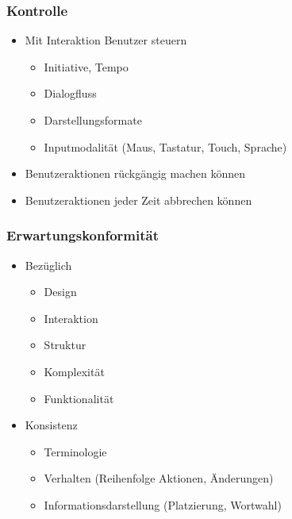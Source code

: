 \documentclass[../ZF_SWEN1.tex]{subfiles}
\begin{document}
\subsubsection{Kontrolle}

\begin{itemize}
	\item Mit Interaktion Benutzer steuern
	\begin{itemize}
		\item Initiative, Tempo
		\item Dialogfluss
		\item Darstellungsformate
		\item Inputmodalität (Maus, Tastatur, Touch, Sprache)
	\end{itemize}
	
	\item Benutzeraktionen rückgängig machen können
	\item Benutzeraktionen jeder Zeit abbrechen können
\end{itemize}

\subsubsection{Erwartungskonformität}
\begin{itemize}
	\item Bezüglich
	\begin{itemize}
		\item Design
		\item Interaktion
		\item Struktur
		\item Komplexität
		\item Funktionalität
	\end{itemize}
	\item Konsistenz
	\begin{itemize}
		\item Terminologie
		\item Verhalten (Reihenfolge Aktionen, Änderungen)
		\item Informationsdarstellung (Platzierung, Wortwahl)
	\end{itemize}
\end{itemize}
\end{document}
